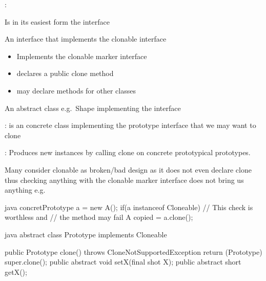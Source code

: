 \begin{partbox}[Participants]
  \begin{itemizenosep}
      \item {}:
      \item
      \begin{itemizenosep}
        \item Is in its easiest form the 
      interface
        \item An interface that implements the clonable interface
        \begin{itemize}
            \item Implements the clonable marker interface
            \item declares a public clone method
            \item may declare methods for other classes
        \end{itemize}
          \item An abstract class e.g.\ Shape implementing the
         interface
      \end{itemizenosep}
        \item {}: is an concrete class implementing the
      prototype interface that we may want to clone
        \item {}: Produces new instances by calling clone on concrete
      prototypical prototypes.
  \end{itemizenosep}
\end{partbox}
\begin{notebox}\nospacing
  Many consider clonable as broken/bad design as it does not even declare clone
  thus checking anything with the clonable marker interface does not bring us
  anything e.g.\
  \begin{mintlinebox}{java}
       concretPrototype a = new A();
       if(a instanceof Cloneable)
       {
         // This check is worthless and
         // the method may fail
           A copied = a.clone(); 
       }
  \end{mintlinebox}
\end{notebox}
\begin{codeboxNl}{java}
abstract class Prototype implements Cloneable {

  public Prototype clone() throws CloneNotSupportedException {
    return (Prototype) super.clone();
  }
  public abstract void setX(final shot X);
  public abstract short getX();
}
\end{codeboxNl}
